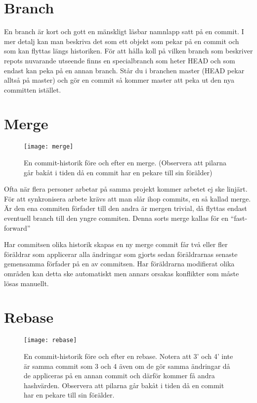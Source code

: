 \documentclass[a4paper,12pt]{article}
\begin{document}
\section{Branch}

En branch är kort och gott en mänskligt läsbar namnlapp satt på en commit.
I mer detalj kan man beskriva det som ett objekt som pekar på en commit och som kan flyttas längs historiken.
För att hålla koll på vilken branch som beskriver repots nuvarande utseende finns en specialbranch som heter HEAD och som endast kan peka på en annan branch.
Står du i branchen master (HEAD pekar alltså på master) och gör en commit så kommer master att peka ut den nya committen istället.

\section{Merge}

\begin{figure}
  \texttt{[image: merge]}
  \caption{En commit-historik före och efter en merge.
    (Observera att pilarna går bakåt i tiden då en commit har en pekare till sin förälder)
  }
  \label{fig:merge}
\end{figure}


Ofta när flera personer arbetar på samma projekt kommer arbetet ej ske linjärt.
För att synkronisera arbete krävs att man slår ihop commits, en så kallad merge.
Är den ena commiten förfader till den andra är mergen trivial, då flyttas endast eventuell branch till den yngre commiten.
Denna sorts merge kallas för en ``fast-forward''

Har commitsen olika historik skapas en ny merge commit får två eller fler föräldrar som applicerar alla ändringar som gjorts sedan föräldrarnas senaste gemensamma förfader på en av commitsen.
Har föräldrarna modifierat olika områden kan detta ske automatiskt men annars orsakas konflikter som måste lösas manuellt.

\section{Rebase}

\begin{figure}
  \texttt{[image: rebase]}
  \caption{
    En commit-historik före och efter en rebase. 
    Notera att 3' och 4' inte är samma commit som 3 och 4 även om de gör samma ändringar då de appliceras på en annan commit och därför kommer få andra hashvärden.
    Observera att pilarna går bakåt i tiden då en commit har en pekare till sin förälder.
  }
  \label{fig:rebase}
\end{figure}
\end{document}
